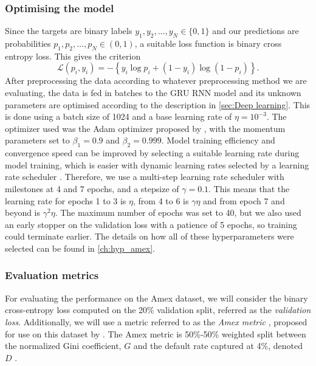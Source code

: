 \documentclass{statsmsc}
\begin{document}
{\subsubsection{Optimising the model}%
\label{ssub:Optimising the model}

Since the targets are binary labels $y_1,y_2,\dots,y_N \in \{0,1\}$ and our predictions are
probabilities $p_1,p_2,\dots,p_N \in (0,1)$, a suitable loss function is binary cross entropy loss.
This gives the criterion
\begin{equation}
    \mathcal{L}(p_i,y_i)=- \left\{y_i \log p_i + (1-y_i) \log\left( 1- p_i \right)\right\}.
\end{equation}
After preprocessing the data according to whatever preprocessing method we are evaluating,
the data is fed
in batches to the \ac{GRU} \ac{RNN} model and its unknown parameters are optimised according
to the description in \cref{sec:Deep learning}. This is done using a batch size of 1024 and
a base learning rate of $\eta=10^{-3}$. The optimizer used was the Adam optimizer proposed by
\cite{adam}, with the momentum parameters set to $\beta_1=0.9$ and $\beta_2=0.999$.
Model training efficiency and convergence speed can be improved by selecting a suitable learning
rate during model training, which is easier with dynamic learning rates selected by a learning
rate scheduler \citep{lr_demyst}. Therefore, we use a multi-step learning rate scheduler with milestones
at 4 and 7 epochs, and a stepsize of $\gamma=0.1$. This means that the learning rate for epochs
1 to 3 is $\eta$, from 4 to 6 is $\gamma\eta$ and from epoch 7 and beyond is $\gamma^2\eta$.
The maximum number of epochs was set to 40, but we also used an early stopper on the validation loss
with a patience of 5 epochs, so training could terminate earlier.
The details on how all of these hyperparameters were selected can be found in \cref{ch:hyp_amex}.

\subsubsection{Evaluation metrics}%
\label{ssub:Evaluation metrics}

For evaluating the performance on the Amex dataset, we will consider the binary cross-entropy loss
computed on the 20\% validation split, referred as the \textit{validation loss}. Additionally,
we will use a metric referred to as the \textit{Amex metric }, proposed for use on this dataset
by \cite{amex-data}. The Amex metric is 50\%-50\% weighted split between the
normalized Gini coefficient, $G$ and the default rate captured at 4\%, denoted $D$
\citep{amex-data}.

}
\end{document}
